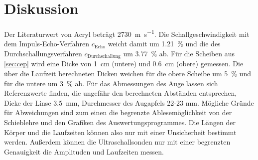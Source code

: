 \section{Diskussion}
\label{sec:Diskussion}

Der Literaturwert von Acryl beträgt \SI{2730}{\meter\per\second}. \cite{Acryl}
Die Schallgeschwindigkeit mit dem Impuls-Echo-Verfahren $c_\text{Echo}$ weicht damit um \SI{1.21}{\percent} und die des Durchschallungsverfahren $c_\text{Durchschallung}$ um \SI{3.77}{\percent} ab.
Für die Scheiben aus \ref{sec:cep} wird eine Dicke von \SI{1}{\centi\meter} (untere) und \SI{0.6}{\centi\meter} (obere) gemessen.
Die über die Laufzeit berechneten Dicken weichen für die obere Scheibe um \SI{5}{\percent} und für die untere um \SI{3}{\percent} ab.
Für das Abmessungen des Auge lassen sich Referenzwerte finden, die ungefähr den berechneten Abständen entsprechen,
Dicke der Linse \SI{3.5}{\milli\meter}, Durchmesser des Augapfels 22-23 mm. \cite{Auge}
Mögliche Gründe für Abweichungen sind zum einen die begrenzte Ablesemöglichkeit von der Schieblehre und den Grafiken des Auswertungsprogrammes.
Die Längen der Körper und die Laufzeiten können also nur mit einer Unsicherheit bestimmt werden.
Außerdem können die Ultraschallsonden nur mit einer begrenzten Genauigkeit die Amplituden und Laufzeiten messen.
